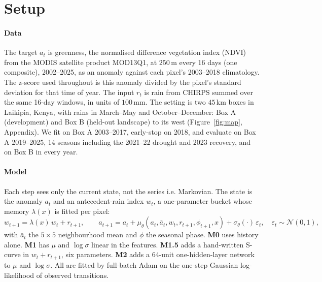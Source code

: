 \documentclass{article}
\begin{document}
\section{Setup}
\paragraph{Data} The target $a_t$ is greenness, the normalised difference vegetation index (NDVI) from the MODIS satellite product MOD13Q1, at $250$\,m every 16 days (one composite), 2002--2025, as an anomaly against each pixel's 2003--2018 climatology. The z-score used throughout is this anomaly divided by the pixel's standard deviation for that time of year. The input $r_t$ is rain from CHIRPS summed over the same 16-day windows, in units of $100$\,mm. The setting is two $45$\,km boxes in Laikipia, Kenya, with rains in March--May and October--December: Box A (development) and Box B (held-out landscape) to its west (Figure~\ref{fig:map}, Appendix). We fit on Box A 2003--2017, early-stop on 2018, and evaluate on Box A 2019--2025, 14 seasons including the 2021--22 drought and 2023 recovery, and on Box B in every year.

\paragraph{Model} Each step sees only the current state, not the series i.e. Markovian. The state is the anomaly $a_t$ and an antecedent-rain index $w_t$, a one-parameter bucket whose memory $\lambda(x)$ is fitted per pixel:
\begin{equation}
w_{t+1} = \lambda(x)\,w_t + r_{t+1}, \qquad
a_{t+1} = a_t + \mu_\theta(a_t, \bar a_t, w_t, r_{t+1}, \phi_{t+1}, x) + \sigma_\theta(\cdot)\,\varepsilon_t,\quad \varepsilon_t\sim\mathcal N(0,1),
\label{eq:model}
\end{equation}
with $\bar a_t$ the $5\times5$ neighbourhood mean and $\phi$ the seasonal phase. \textbf{M0} uses history alone. \textbf{M1} has $\mu$ and $\log\sigma$ linear in the features. \textbf{M1.5} adds a hand-written S-curve in $w_t+r_{t+1}$, six parameters. \textbf{M2} adds a 64-unit one-hidden-layer network to $\mu$ and $\log\sigma$. All are fitted by full-batch Adam on the one-step Gaussian log-likelihood of observed transitions.
\end{document}
